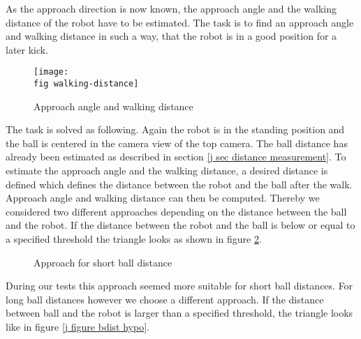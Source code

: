 As the approach direction is now known, the approach angle and the walking
distance of the robot have to be estimated. The task is to find an approach
angle and walking distance in such a way, that the robot is in a good position
for a later kick.

\begin{figure}[ht]
  \texttt{[image: \\fig walking-distance]}
  \caption{Approach angle and walking distance}
  \label{j figure approach angle and walking distance}
\end{figure}


The task is solved as following. Again the robot is in the standing position
and the ball is centered in the camera view of the top camera. The ball
distance has already been estimated as described in section \ref{j sec distance
  measurement}. To estimate the approach angle and the walking distance, a
desired distance is defined which defines the distance between the robot and
the ball after the walk. Approach angle and walking distance can then be
computed. Thereby we considered two different approaches depending on the
distance between the ball and the robot. If the distance between the robot and
the ball is below or equal to a specified threshold the triangle looks as shown
in figure \ref{j figure rdist hypo}.

\begin{figure}[ht]
  \centering
  \caption{Approach for short ball distance}
  \label{j figure rdist hypo}
\end{figure}


During our tests this approach seemed more suitable for short ball distances.
For long ball distances however we choose a different approach. If the distance
between ball and the robot is larger than a specified threshold, the triangle
looks like in figure \ref{j figure bdist hypo}.

